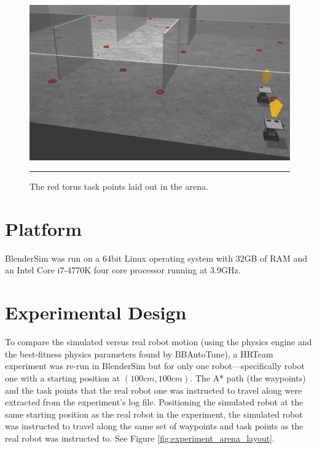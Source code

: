 \begin{figure}[htbp]
\centering
\includegraphics[scale=0.32]{../Figures/Chapter5/taskPoints.png}
\rule{35em}{0.5pt}
\caption[Simulated Task Points]{The red torus task points laid out in the arena.}
\label{fig:task_points}
\end{figure}

\section{Platform}

BlenderSim was run on a 64bit Linux operating system with 32GB of RAM and an Intel Core i7-4770K four core processor running at 3.9GHz.

\section{Experimental Design}

To compare the simulated versus real robot motion (using the physics engine and the best-fitness physics parameters found by BBAutoTune), a HRTeam experiment was re-run in BlenderSim but for only one robot---specifically robot one with a starting position at $(100cm,100cm)$. The A* path (the waypoints) and the task points that the real robot one was instructed to travel along were extracted from the experiment's log file. Positioning the simulated robot at the same starting position as the real robot in the experiment, the simulated robot was instructed to travel along the same set of waypoints and task points as the real robot was instructed to. See Figure \ref{fig:experiment_arena_layout}.

